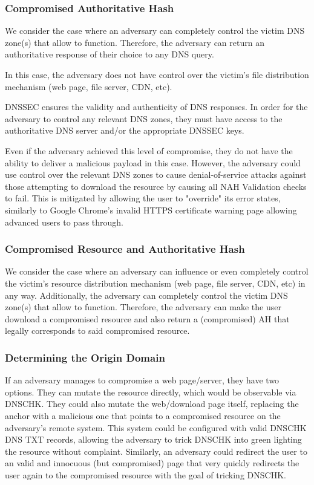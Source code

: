 \subsubsection{Compromised Authoritative Hash}

We consider the case where an adversary can completely control the victim DNS
zone(s) that allow \SYSTEM{} to function. Therefore, the adversary can return an
authoritative response of their choice to any DNS query.

In this case, the adversary does not have control over the victim's file
distribution mechanism (web page, file server, CDN, etc).

DNSSEC ensures the validity and authenticity of DNS responses. In order for the
adversary to control any relevant DNS zones, they must have access to the
authoritative DNS server and/or the appropriate DNSSEC keys.

Even if the adversary achieved this level of compromise, they do not have the
ability to deliver a malicious payload in this case. However, the adversary
could use control over the relevant DNS zones to cause denial-of-service attacks
against those attempting to download the resource by causing all NAH Validation
checks to fail. This is mitigated by \SYSTEM{} allowing the user to "override"
its error states, similarly to Google Chrome's invalid HTTPS certificate warning
page allowing advanced users to pass through.

\subsubsection{Compromised Resource and Authoritative Hash}

We consider the case where an adversary can influence or even completely control
the victim's resource distribution mechanism (web page, file server, CDN, etc)
in any way. Additionally, the adversary can completely control the victim DNS
zone(s) that allow \SYSTEM{} to function. Therefore, the adversary can make the
user download a compromised resource and also return a (compromised) AH that
legally corresponds to said compromised resource.

\subsubsection{Determining the Origin Domain}

If an adversary manages to compromise a web page/server, they have two options. They can mutate the resource directly, which would be observable via DNSCHK. They could also mutate the web/download page itself, replacing the anchor with a malicious one that points to a compromised resource on the adversary's remote system. This system could be configured with valid DNSCHK DNS TXT records, allowing the adversary to trick DNSCHK into green lighting the resource without complaint. Similarly, an adversary could redirect the user to an valid and innocuous (but compromised) page that very quickly redirects the user again to the compromised resource with the goal of tricking DNSCHK.

